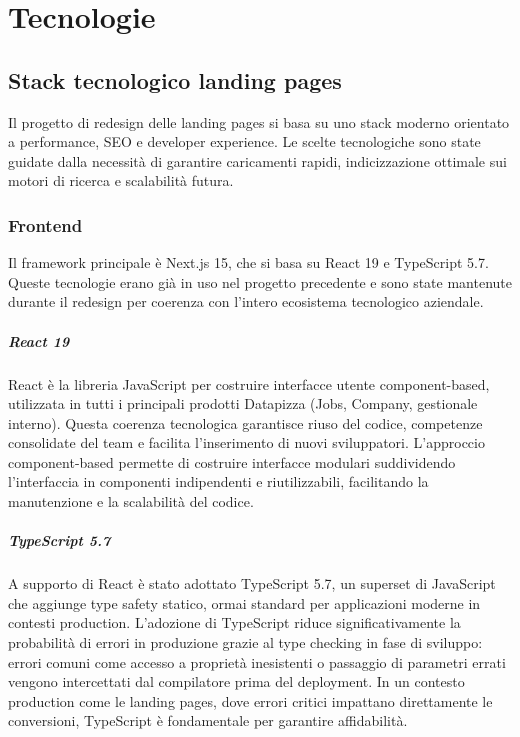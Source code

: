 \chapter{Tecnologie}

\section{Stack tecnologico landing pages}
Il progetto di redesign delle landing pages si basa su uno stack moderno 
orientato a performance, SEO e developer experience. Le scelte tecnologiche 
sono state guidate dalla necessità di garantire caricamenti rapidi, 
indicizzazione ottimale sui motori di ricerca e scalabilità futura.

\subsection{Frontend}

Il framework principale è Next.js 15, che si basa su React 19 e TypeScript 
5.7. Queste tecnologie erano già in uso nel progetto precedente e sono 
state mantenute durante il redesign per coerenza con l'intero ecosistema 
tecnologico aziendale.

\paragraph{React 19}
React è la libreria JavaScript per costruire interfacce utente component-based, 
utilizzata in tutti i principali prodotti Datapizza (Jobs, Company, gestionale 
interno). Questa coerenza tecnologica garantisce riuso del codice, competenze 
consolidate del team e facilita l'inserimento di nuovi sviluppatori. L'approccio 
component-based permette di costruire interfacce modulari suddividendo 
l'interfaccia in componenti indipendenti e riutilizzabili, facilitando la 
manutenzione e la scalabilità del codice.

\paragraph{TypeScript 5.7}
A supporto di React è stato adottato TypeScript 5.7, un superset di 
JavaScript che aggiunge type safety statico, ormai standard per applicazioni 
moderne in contesti production. L'adozione di TypeScript riduce significativamente 
la probabilità di errori in produzione grazie al type checking in fase di 
sviluppo: errori comuni come accesso a proprietà inesistenti o passaggio di 
parametri errati vengono intercettati dal compilatore prima del deployment. 
In un contesto production come le landing pages, dove errori critici impattano 
direttamente le conversioni, TypeScript è fondamentale per garantire affidabilità.

